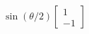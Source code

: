 \documentclass[preview]{standalone}
\begin{document}
\begin{align*}
{}\sin(\theta/2) \begin{bmatrix} 1 \\ -1\end{bmatrix}
\end{align*}
\end{document}
